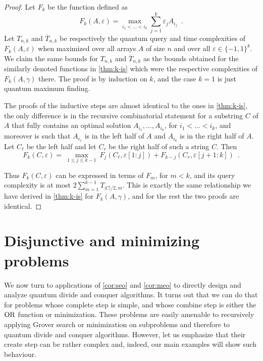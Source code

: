 \documentclass[12pt]{article}
\theoremstyle{definition}
\begin{document}
\begin{proof}
Let $F_k$ be the function defined as
\[
F_k(A, \varepsilon) =  \max_{i_1 < \ldots < i_k } \sum_{j =1}^k  \varepsilon_j A_{i_j}
 \enspace.
\] 
Let $T_{n,k}$ and $\overline{T}_{n,k}$  be respectively the quantum query and time complexities of $F_k(A, \varepsilon)$ when maximized over all arrays $A$ of size $n$ and over all $\varepsilon \in \{-1,1\}^k$. 
We claim the same bounds for $T_{n,k}$ and $\overline{T}_{n,k}$ as the bounds obtained for the similarly denoted functions in \cref{thm:k-is} which were the respective complexities of $F_k(A, \gamma)$ there.
The proof is by induction on $k$, and the case $k=1$ is just quantum maximum finding.

The proofs of the inductive steps are almost identical to the ones in \cref{thm:k-is}, the only difference is in the recursive combinatorial statement for a substring $C$ of $A$ that fully contains an optimal solution $A_{i_1}, \ldots, A_{i_k}$, for $i_1 < \ldots < i_k$, and moreover is such that $A_{i_1}$ is in the left half of $A$ and $A_{i_k}$ is in the right half of $A$. Let 
$C_\ell$ be the left half and let $C_r$ be the right half of such a string $C$.
Then
\[
F_k(C, \varepsilon) = 
\ \max_{ 1 \leq j \leq k-1} \ F_j(C_\ell , \varepsilon[1 \colon j] ) + F_{k-j} (C_r, \varepsilon[j+1 \colon k] ) 
\enspace .
\]

Thus $F_k(C, \varepsilon)$ can be expressed in terms of $F_m$, for $m< k$, and its query complexity is at most $2\sum_{m=1}^{k-1} T_{|C|/2, m}$.   This is exactly the same relationship we have derived in \cref{thm:k-is} for $F_k(A, \gamma)$, and for the rest the two proofs are identical.
\end{proof}



\section{Disjunctive and minimizing problems}
\label{sec:disj}
We now turn to applications of \cref{cor:seo} and \cref{cor:meo} to directly design and analyze quantum divide and conquer algorithms. 
It turns out that we can do that for problems whose complete step is simple, and whose combine step is either the ${\rm OR}$ function or minimization. 
These problems are easily amenable to recursively applying Grover search or minimization on subproblems and therefore to quantum divide and conquer algorithms. However, let us emphasize that their create step can be rather complex and, indeed, our main examples will show such behaviour.
\end{document}
